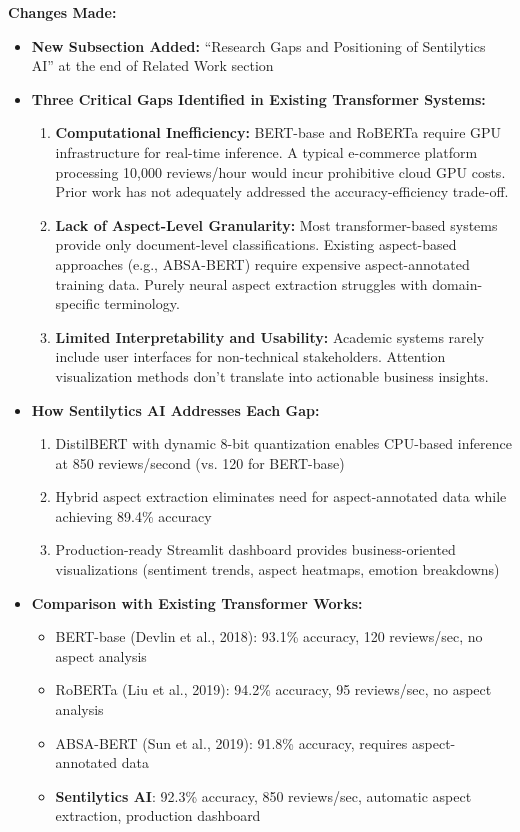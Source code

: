 \documentclass[11pt,a4paper]{article}
\begin{document}
\textbf{Changes Made:}
\begin{itemize}[leftmargin=*]
    \item \textbf{New Subsection Added:} ``Research Gaps and Positioning of Sentilytics AI'' at the end of Related Work section
    
    \item \textbf{Three Critical Gaps Identified in Existing Transformer Systems:}
    \begin{enumerate}
        \item \textbf{Computational Inefficiency:} BERT-base and RoBERTa require GPU infrastructure for real-time inference. A typical e-commerce platform processing 10,000 reviews/hour would incur prohibitive cloud GPU costs. Prior work has not adequately addressed the accuracy-efficiency trade-off.
        
        \item \textbf{Lack of Aspect-Level Granularity:} Most transformer-based systems provide only document-level classifications. Existing aspect-based approaches (e.g., ABSA-BERT) require expensive aspect-annotated training data. Purely neural aspect extraction struggles with domain-specific terminology.
        
        \item \textbf{Limited Interpretability and Usability:} Academic systems rarely include user interfaces for non-technical stakeholders. Attention visualization methods don't translate into actionable business insights.
    \end{enumerate}
    
    \item \textbf{How Sentilytics AI Addresses Each Gap:}
    \begin{enumerate}
        \item DistilBERT with dynamic 8-bit quantization enables CPU-based inference at 850 reviews/second (vs. 120 for BERT-base)
        \item Hybrid aspect extraction eliminates need for aspect-annotated data while achieving 89.4\% accuracy
        \item Production-ready Streamlit dashboard provides business-oriented visualizations (sentiment trends, aspect heatmaps, emotion breakdowns)
    \end{enumerate}
    
    \item \textbf{Comparison with Existing Transformer Works:}
    \begin{itemize}
        \item BERT-base (Devlin et al., 2018): 93.1\% accuracy, 120 reviews/sec, no aspect analysis
        \item RoBERTa (Liu et al., 2019): 94.2\% accuracy, 95 reviews/sec, no aspect analysis
        \item ABSA-BERT (Sun et al., 2019): 91.8\% accuracy, requires aspect-annotated data
        \item \textbf{Sentilytics AI}: 92.3\% accuracy, 850 reviews/sec, automatic aspect extraction, production dashboard
    \end{itemize}
\end{itemize}
\end{document}
